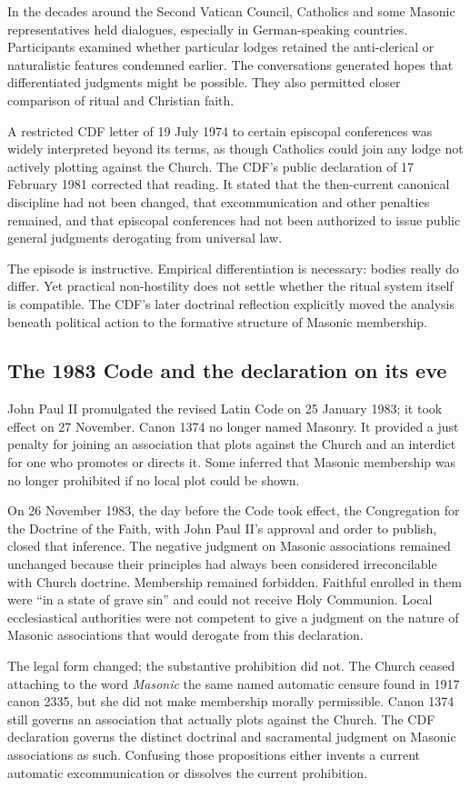 In the decades around the Second Vatican Council, Catholics and some Masonic representatives held dialogues, especially in German-speaking countries. Participants examined whether particular lodges retained the anti-clerical or naturalistic features condemned earlier. The conversations generated hopes that differentiated judgments might be possible. They also permitted closer comparison of ritual and Christian faith.

A restricted CDF letter of 19 July 1974 to certain episcopal conferences was widely interpreted beyond its terms, as though Catholics could join any lodge not actively plotting against the Church. The CDF's public declaration of 17 February 1981 corrected that reading. It stated that the then-current canonical discipline had not been changed, that excommunication and other penalties remained, and that episcopal conferences had not been authorized to issue public general judgments derogating from universal law.

The episode is instructive. Empirical differentiation is necessary: bodies really do differ. Yet practical non-hostility does not settle whether the ritual system itself is compatible. The CDF's later doctrinal reflection explicitly moved the analysis beneath political action to the formative structure of Masonic membership.

\subsection{The 1983 Code and the declaration on its eve}

John Paul II promulgated the revised Latin Code on 25 January 1983; it took effect on 27 November. Canon 1374 no longer named Masonry. It provided a just penalty for joining an association that plots against the Church and an interdict for one who promotes or directs it. Some inferred that Masonic membership was no longer prohibited if no local plot could be shown.

On 26 November 1983, the day before the Code took effect, the Congregation for the Doctrine of the Faith, with John Paul II's approval and order to publish, closed that inference. The negative judgment on Masonic associations remained unchanged because their principles had always been considered irreconcilable with Church doctrine. Membership remained forbidden. Faithful enrolled in them were “in a state of grave sin” and could not receive Holy Communion. Local ecclesiastical authorities were not competent to give a judgment on the nature of Masonic associations that would derogate from this declaration.

The legal form changed; the substantive prohibition did not. The Church ceased attaching to the word \emph{Masonic} the same named automatic censure found in 1917 canon 2335, but she did not make membership morally permissible. Canon 1374 still governs an association that actually plots against the Church. The CDF declaration governs the distinct doctrinal and sacramental judgment on Masonic associations as such. Confusing those propositions either invents a current automatic excommunication or dissolves the current prohibition.
